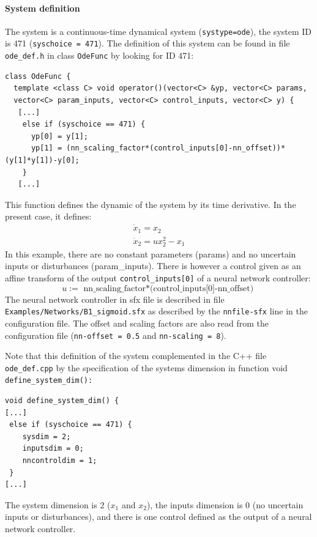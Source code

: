 \documentclass{article}
\begin{document}
\paragraph{System definition}
The system is a continuous-time dynamical system (\texttt{systype=ode}),  the system ID is 471 (\texttt{syschoice = 471}). 
The definition of this system can be found in file \texttt{ode\_def.h} in class \texttt{OdeFunc} by looking for ID 471:
\small
\lstset {language=C++}
\begin{lstlisting}
class OdeFunc {
  template <class C> void operator()(vector<C> &yp, vector<C> params, 
  vector<C> param_inputs, vector<C> control_inputs, vector<C> y) { 
   [...]      
    else if (syschoice == 471) {
      yp[0] = y[1];
      yp[1] = (nn_scaling_factor*(control_inputs[0]-nn_offset))*(y[1]*y[1])-y[0];
    }
   [...]
\end{lstlisting}
\normalsize
This function defines the dynamic of the system by its time derivative.  In the present case,  it defines:
 \[ 
 \begin{array}{l} \dot x_1  = x_2 \\
              \dot x_2 = u x_2^2 - x_1 \end{array} 
\]
In this example, there are no constant parameters (params) and no uncertain inputs or disturbances (param\_inputs).  There is however a control given as an affine transform of the output \texttt{control\_inputs[0]} of a neural network controller:
\[ u := \mbox{ nn\_scaling\_factor*(control\_inputs[0]-nn\_offset) }\]
The neural network controller in sfx file is described in file \texttt{Examples/Networks/B1\_sigmoid.sfx} as described by the \texttt{nnfile-sfx} line in the configuration file. The offset and scaling factors are also read from the configuration file (\texttt{nn-offset = 0.5} and \texttt{nn-scaling = 8}).

Note that this definition of the system complemented in the C++ file \texttt{ode\_def.cpp} by the specification of the systems dimension in function void \texttt{define\_system\_dim():}
\small
\lstset {language=C++}
\begin{lstlisting}
void define_system_dim() {
[...]
 else if (syschoice == 471) {  
    sysdim = 2;
    inputsdim = 0;
    nncontroldim = 1;
 }
[...]
\end{lstlisting}
\normalsize
The system dimension is 2 ($x_1$ and $x_2$), the inputs dimension is 0 (no uncertain inputs or disturbances), and there is one control defined as the output of a neural network controller.
\end{document}
